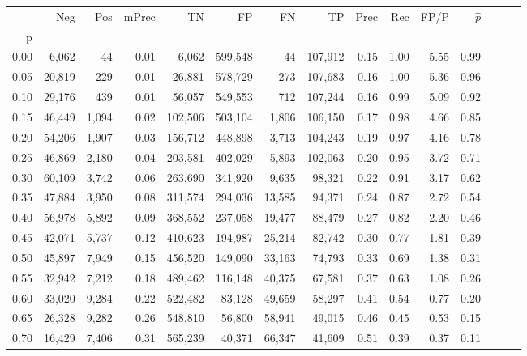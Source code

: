 \begin{tabular}{rrrrrrrrrrrrrrr}
\toprule
{} &     Neg &    Pos & mPrec &       TN &       FP &       FN &       TP &  Prec &   Rec &  FP/P & $\hat{p}$ \\
p    &         &        &       &          &          &          &          &       &       &       &           \\
\midrule
0.00 &   6,062 &     44 &  0.01 &    6,062 &  599,548 &       44 &  107,912 &  0.15 &  1.00 &  5.55 &      0.99 \\
0.05 &  20,819 &    229 &  0.01 &   26,881 &  578,729 &      273 &  107,683 &  0.16 &  1.00 &  5.36 &      0.96 \\
0.10 &  29,176 &    439 &  0.01 &   56,057 &  549,553 &      712 &  107,244 &  0.16 &  0.99 &  5.09 &      0.92 \\
0.15 &  46,449 &  1,094 &  0.02 &  102,506 &  503,104 &    1,806 &  106,150 &  0.17 &  0.98 &  4.66 &      0.85 \\
0.20 &  54,206 &  1,907 &  0.03 &  156,712 &  448,898 &    3,713 &  104,243 &  0.19 &  0.97 &  4.16 &      0.78 \\
0.25 &  46,869 &  2,180 &  0.04 &  203,581 &  402,029 &    5,893 &  102,063 &  0.20 &  0.95 &  3.72 &      0.71 \\
0.30 &  60,109 &  3,742 &  0.06 &  263,690 &  341,920 &    9,635 &   98,321 &  0.22 &  0.91 &  3.17 &      0.62 \\
0.35 &  47,884 &  3,950 &  0.08 &  311,574 &  294,036 &   13,585 &   94,371 &  0.24 &  0.87 &  2.72 &      0.54 \\
0.40 &  56,978 &  5,892 &  0.09 &  368,552 &  237,058 &   19,477 &   88,479 &  0.27 &  0.82 &  2.20 &      0.46 \\
0.45 &  42,071 &  5,737 &  0.12 &  410,623 &  194,987 &   25,214 &   82,742 &  0.30 &  0.77 &  1.81 &      0.39 \\
0.50 &  45,897 &  7,949 &  0.15 &  456,520 &  149,090 &   33,163 &   74,793 &  0.33 &  0.69 &  1.38 &      0.31 \\
0.55 &  32,942 &  7,212 &  0.18 &  489,462 &  116,148 &   40,375 &   67,581 &  0.37 &  0.63 &  1.08 &      0.26 \\
0.60 &  33,020 &  9,284 &  0.22 &  522,482 &   83,128 &   49,659 &   58,297 &  0.41 &  0.54 &  0.77 &      0.20 \\
0.65 &  26,328 &  9,282 &  0.26 &  548,810 &   56,800 &   58,941 &   49,015 &  0.46 &  0.45 &  0.53 &      0.15 \\
0.70 &  16,429 &  7,406 &  0.31 &  565,239 &   40,371 &   66,347 &   41,609 &  0.51 &  0.39 &  0.37 &      0.11 \\

\end{tabular}
